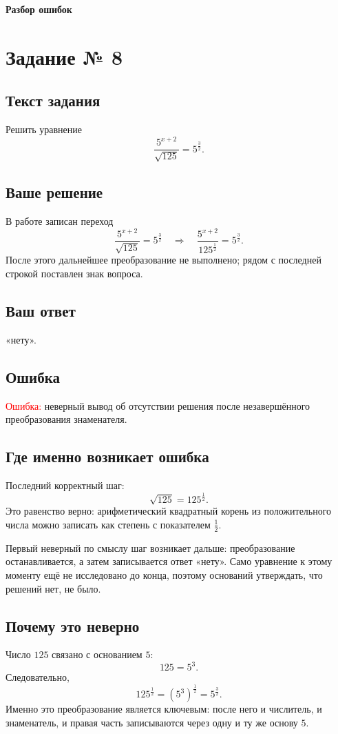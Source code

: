 \documentclass[12pt,a4paper]{article}
\begin{document}
\newpage
\vspace*{\fill}
\begin{center}
{\LARGE\bfseries Разбор ошибок}
\end{center}
\vspace*{\fill}
\newpage

\label{task:8}
\section*{Задание № 8}

\subsection*{Текст задания}
Решить уравнение
\[
\frac{5^{x+2}}{\sqrt{125}}=5^{\frac32}.
\]

\subsection*{Ваше решение}
В работе записан переход
\[
\frac{5^{x+2}}{\sqrt{125}}=5^{\frac32}
\quad\Longrightarrow\quad
\frac{5^{x+2}}{125^{\frac12}}=5^{\frac32}.
\]
После этого дальнейшее преобразование не выполнено; рядом с последней строкой поставлен знак вопроса.

\subsection*{Ваш ответ}
«нету».

\subsection*{Ошибка}
\textcolor{red}{Ошибка:} неверный вывод об отсутствии решения после незавершённого преобразования знаменателя.

\subsection*{Где именно возникает ошибка}
Последний корректный шаг:
\[
\sqrt{125}=125^{\frac12}.
\]
Это равенство верно: арифметический квадратный корень из положительного числа можно записать как степень с показателем $\frac12$.

Первый неверный по смыслу шаг возникает дальше: преобразование останавливается, а затем записывается ответ «нету». Само уравнение к этому моменту ещё не исследовано до конца, поэтому оснований утверждать, что решений нет, не было.

\subsection*{Почему это неверно}
Число $125$ связано с основанием $5$:
\[
125=5^3.
\]
Следовательно,
\[
125^{\frac12}=(5^3)^{\frac12}=5^{\frac32}.
\]
Именно это преобразование является ключевым: после него и числитель, и знаменатель, и правая часть записываются через одну и ту же основу $5$.
\end{document}
